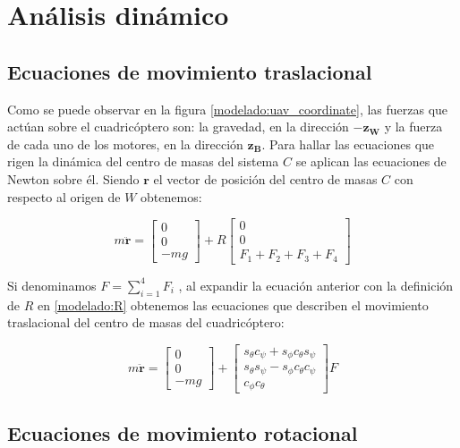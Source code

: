 \section{Análisis dinámico}
\subsection{Ecuaciones de movimiento traslacional}
Como se puede observar en la figura \ref{modelado:uav_coordinate}, las fuerzas que actúan sobre el cuadricóptero son: la gravedad, en la dirección $-\mathbf{z_W}$ y la fuerza de cada uno de los motores, en la dirección $\mathbf{z_B}$. Para hallar las ecuaciones que rigen la dinámica del centro de masas del sistema $C$ se aplican las ecuaciones de Newton sobre él. Siendo $\mathbf{r}$ el vector de posición del centro de masas $C$ con respecto al origen de $W$ obtenemos:

\begin{equation}
	\label{analisis:eq1}
	m \mathbf{\ddot{r}} = \begin{bmatrix}
		0\\
		0\\
		-mg
	\end{bmatrix} + R \begin{bmatrix}
	0\\
	0\\
	F_1+F_2 + F_3 + F_4
\end{bmatrix}
\end{equation}

Si denominamos $F  = \displaystyle\sum_{i=1}^{4}F_i$ , al expandir la ecuación anterior con la definición de $R$ en \ref{modelado:R} obtenemos las ecuaciones que describen el movimiento traslacional del centro de masas del cuadricóptero:

\begin{equation}
	\label{analisis:eq2}
	m \mathbf{\ddot{r}} = \begin{bmatrix}
		0\\
		0\\
		-mg
	\end{bmatrix} +\begin{bmatrix}
		s_{\theta}c_{\psi} + s_{\phi}c_{\theta}s_{\psi} \\
		s_{\theta}s_{\psi} - s_{\phi}c_{\theta}c_{\psi} \\
		c_{\phi}c_{\theta}
	\end{bmatrix} F
\end{equation}

\subsection{Ecuaciones de movimiento rotacional}

